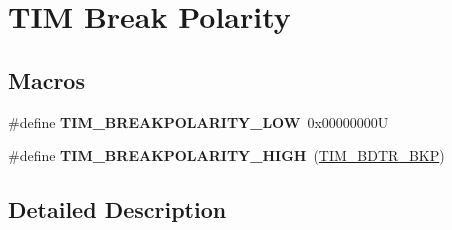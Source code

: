 \hypertarget{group___t_i_m___break___polarity}{}\section{T\+IM Break Polarity}
\label{group___t_i_m___break___polarity}
\subsection*{Macros}
\begin{DoxyCompactItemize}
\item 
\mbox{\label{group___t_i_m___break___polarity_ga3e07cb0376c1bf561341dc8befb66208}} 
\#define {\bfseries T\+I\+M\+\_\+\+B\+R\+E\+A\+K\+P\+O\+L\+A\+R\+I\+T\+Y\+\_\+\+L\+OW}~0x00000000U
\item 
\mbox{\label{group___t_i_m___break___polarity_ga97c30f1134accd61e3e42ce37e472700}} 
\#define {\bfseries T\+I\+M\+\_\+\+B\+R\+E\+A\+K\+P\+O\+L\+A\+R\+I\+T\+Y\+\_\+\+H\+I\+GH}~(\mbox{\hyperlink{group___peripheral___registers___bits___definition_ga3247abbbf0d00260be051d176d88020e}{T\+I\+M\+\_\+\+B\+D\+T\+R\+\_\+\+B\+KP}})
\end{DoxyCompactItemize}


\subsection{Detailed Description}
